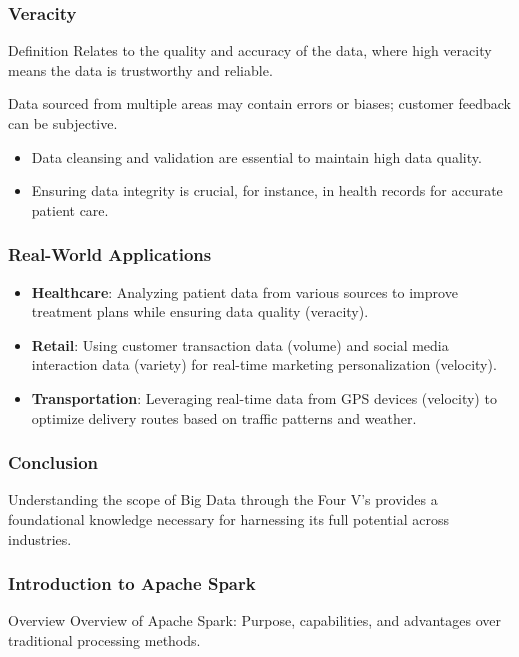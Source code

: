 \documentclass[aspectratio=169]{beamer}
\begin{document}
\begin{frame}[fragile]
    \frametitle{Veracity}
    \begin{block}{Definition}
        Relates to the quality and accuracy of the data, where high veracity means the data is trustworthy and reliable.
    \end{block}
    \begin{example}
        Data sourced from multiple areas may contain errors or biases; customer feedback can be subjective.
    \end{example}
    \begin{itemize}
        \item Data cleansing and validation are essential to maintain high data quality.
        \item Ensuring data integrity is crucial, for instance, in health records for accurate patient care.
    \end{itemize}
\end{frame}

\begin{frame}[fragile]
    \frametitle{Real-World Applications}
    \begin{itemize}
        \item \textbf{Healthcare}: Analyzing patient data from various sources to improve treatment plans while ensuring data quality (veracity).
        \item \textbf{Retail}: Using customer transaction data (volume) and social media interaction data (variety) for real-time marketing personalization (velocity).
        \item \textbf{Transportation}: Leveraging real-time data from GPS devices (velocity) to optimize delivery routes based on traffic patterns and weather.
    \end{itemize}
\end{frame}

\begin{frame}[fragile]
    \frametitle{Conclusion}
    Understanding the scope of Big Data through the Four V's provides a foundational knowledge necessary for harnessing its full potential across industries.
\end{frame}

\begin{frame}[fragile]
    \frametitle{Introduction to Apache Spark}
    \begin{block}{Overview}
        Overview of Apache Spark: Purpose, capabilities, and advantages over traditional processing methods.
    \end{block}
\end{frame}
\end{document}
